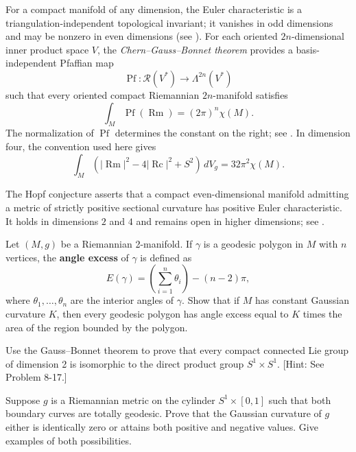 For a compact manifold of any dimension, the Euler characteristic is a
triangulation-independent topological invariant; it vanishes in odd dimensions
and may be nonzero in even dimensions (see \cite[Thm. 13.36]{LeeTM}). For each
oriented $2n$-dimensional inner product space $V$, the
\emph{Chern--Gauss--Bonnet theorem} provides a basis-independent Pfaffian map
\[
\operatorname{Pf}\colon\mathcal R(V^*)\longrightarrow\Lambda^{2n}(V^*)
\]
such that every oriented compact Riemannian $2n$-manifold satisfies
\[
\int_M\operatorname{Pf}(\operatorname{Rm})=(2\pi)^n\chi(M).
\]
The normalization of $\operatorname{Pf}$ determines the constant on the right;
see \cite[Vol. 5]{Spi79}. In dimension four, the convention used here gives
\begin{equation}
\int_M\left(
|\operatorname{Rm}|^2-4|\operatorname{Rc}|^2+S^2
\right)\,dV_g
=32\pi^2\chi(M).
\label{eq:chern-gauss-bonnet-4d}
\tag{9.14}
\end{equation}

The Hopf conjecture asserts that a compact even-dimensional manifold admitting
a metric of strictly positive sectional curvature has positive Euler
characteristic. It holds in dimensions $2$ and $4$ and remains open in higher
dimensions; see \cite[p. 320]{Pet16}.

\begin{exercise}
\label{prob:angle-excess-formula}
Let $(M, g)$ be a Riemannian 2-manifold. If $\gamma$ is a geodesic polygon in $M$ with $n$ vertices, the \textbf{angle excess} of $\gamma$ is defined as
\[
E(\gamma) = \left(\sum_{i=1}^{n} \theta_i\right) - (n-2)\pi,
\]
where $\theta_1, \ldots, \theta_n$ are the interior angles of $\gamma$. Show that if $M$ has constant Gaussian curvature $K$, then every geodesic polygon has angle excess equal to $K$ times the area of the region bounded by the polygon.
\end{exercise}

\begin{exercise}
\label{prob:compact-lie-groups-isomorphic}
Use the Gauss--Bonnet theorem to prove that every compact connected Lie
group of dimension 2 is isomorphic to the direct product group $S^1 \times S^1$.
[Hint: See Problem 8-17.]
\end{exercise}

\begin{exercise}
\label{prob:cylinder-metric-gaussian-curvature}
Suppose $g$ is a Riemannian metric on the cylinder $S^1 \times [0,1]$ such that both
boundary curves are totally geodesic. Prove that the Gaussian curvature of
$g$ either is identically zero or attains both positive and negative values. Give
examples of both possibilities.
\end{exercise}

